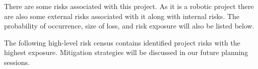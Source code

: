 There are some risks associated with this project. As it is a robotic project there are also some external risks associated with it along with internal risks. The probability of occurrence, size of loss, and risk exposure will also be listed below.

The following high-level risk census contains identified project risks with the highest exposure. Mitigation strategies will be discussed in our future planning sessions.

\begin{table}[h]
\caption{Overview of highest exposure project risks} 
\end{table}